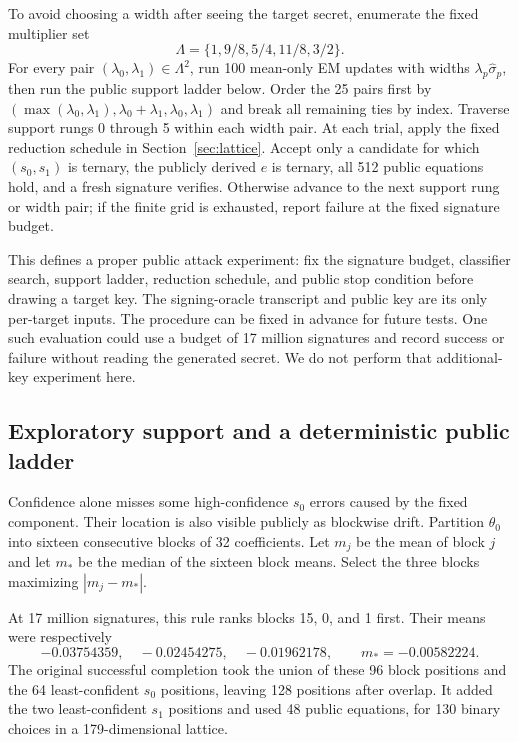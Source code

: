 \documentclass[11pt,a4paper]{article}
\begin{document}
To avoid choosing a width after seeing the target secret, enumerate the fixed
multiplier set
\[
             \Lambda=\{1,9/8,5/4,11/8,3/2\}.
\]
For every pair $(\lambda_0,\lambda_1)\in\Lambda^2$, run 100 mean-only EM
updates with widths $\lambda_p\widehat\sigma_p$, then run the public support
ladder below.  Order the 25 pairs first by
$(\max(\lambda_0,\lambda_1),\lambda_0+\lambda_1,\lambda_0,\lambda_1)$ and
break all remaining ties by index.  Traverse support rungs 0 through 5 within
each width pair.  At each trial, apply the fixed reduction schedule in
Section~\ref{sec:lattice}.  Accept only a candidate for which
$(s_0,s_1)$ is ternary, the publicly derived $e$ is ternary, all 512 public
equations hold, and a fresh signature verifies.  Otherwise advance to the
next support rung or width pair; if the finite grid is exhausted, report
failure at the fixed signature budget.

This defines a proper public attack experiment: fix the signature
budget, classifier search, support ladder, reduction schedule, and public stop
condition before drawing a target key.  The signing-oracle transcript and
public key are its only per-target inputs.  The procedure can be fixed in
advance for future tests.  One such evaluation could use a budget of 17
million signatures and record success or failure without reading the
generated secret.  We do not perform that additional-key experiment here.

\subsection{Exploratory support and a deterministic public ladder}
\label{sec:public-support}

Confidence alone misses some high-confidence $s_0$ errors caused by the
fixed component.  Their location is also visible publicly as blockwise drift.
Partition $\theta_0$ into sixteen consecutive blocks of 32 coefficients.  Let
$m_j$ be the mean of block $j$ and let $m_*$ be the median of the sixteen
block means.  Select the three blocks maximizing $|m_j-m_*|$.

At 17 million signatures, this rule ranks blocks 15, 0, and 1 first.  Their
means were respectively
\[
       -0.03754359,\quad -0.02454275,\quad -0.01962178,
       \qquad m_*=-0.00582224.
\]
The original successful completion took the union of these 96 block positions
and the 64 least-confident $s_0$ positions, leaving 128 positions after
overlap.  It added the two least-confident $s_1$ positions and used 48 public
equations, for 130 binary choices in a 179-dimensional lattice.
\end{document}
